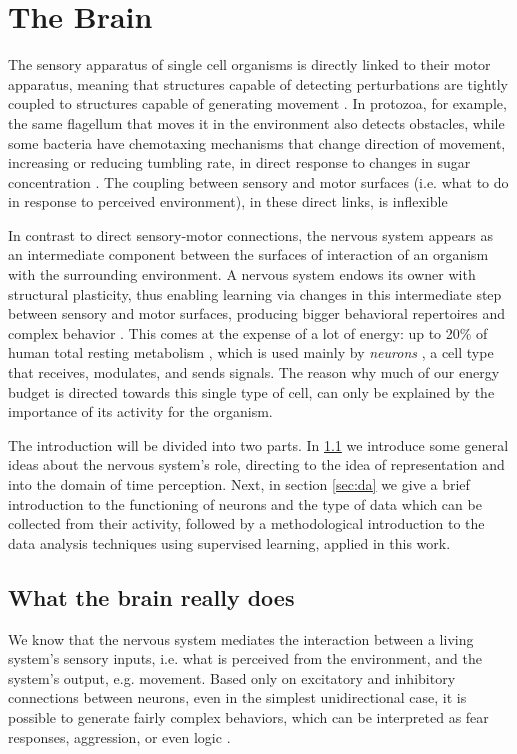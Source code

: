 \chapter{The Brain}
\label{cap:thebrain}

The sensory apparatus of single cell organisms is directly linked to their motor apparatus, meaning that structures capable of detecting perturbations are tightly coupled to structures capable of generating movement \cite[p.~149]{maturana1987tree}. In protozoa, for example, the same flagellum that moves it in the environment also detects obstacles, while some bacteria have chemotaxing mechanisms that change direction of movement, increasing or reducing tumbling rate, in direct response to changes in sugar concentration \cite[p.~147-149]{maturana1987tree}. The coupling between sensory and motor surfaces (i.e. what to do in response to perceived environment), in these direct links, is inflexible %

In contrast to direct sensory-motor connections, the nervous system appears as an intermediate component between the surfaces of interaction of an organism with the surrounding environment. A nervous system endows its owner with structural plasticity, thus enabling learning via changes in this intermediate step between sensory and motor surfaces, producing bigger behavioral repertoires and complex behavior \cite[p.~175]{maturana1987tree}. This comes at the expense of a lot of energy: up to 20\% of human total resting metabolism \cite{attwell2001energy}, which is used mainly by \textit{neurons} \cite{zhu2012quantitative}, a cell type that receives, modulates, and sends signals. The reason why much of our energy budget is directed towards this single type of cell, can only be explained by the importance of its activity for the organism.

The introduction will be divided into two parts. In \ref{sec:theory} we introduce some general ideas about the nervous system's role, directing to the idea of representation and into the domain of time perception. Next, in section \ref{sec:da} we give a brief introduction to the functioning of neurons and the type of data which can be collected from their activity, followed by a methodological introduction to the data analysis techniques using supervised learning, applied in this work.

\section{What the brain really does}
\label{sec:theory}
We know that the nervous system mediates the interaction between a living system's sensory inputs, i.e. what is perceived from the environment, and the system's output, e.g. movement. Based only on excitatory and inhibitory connections between neurons, even in the simplest unidirectional case, it is possible to generate fairly complex behaviors, which can be interpreted as fear responses, aggression, or even logic \cite{braitenberg1986vehicles}. %

